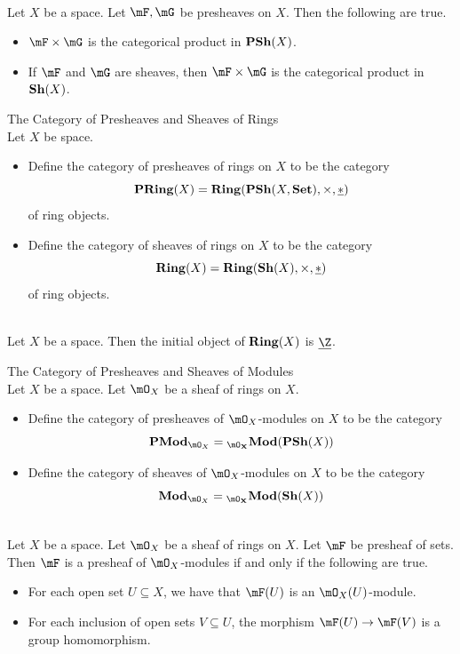 \documentclass[a4paper]{article}
\begin{document}
\begin{prp}{}{}\\
Let $X$ be a space. Let $\mF,\mG$ be presheaves on $X$. Then the following are true. 
\begin{itemize}
\item $\mF\times\mG$ is the categorical product in $\bold{PSh}(X)$. 
\item If $\mF$ and $\mG$ are sheaves, then $\mF\times\mG$ is the categorical product in $\bold{Sh}(X)$. 
\end{itemize}
\end{prp}

\begin{defn}{The Category of Presheaves and Sheaves of Rings}{}\\
Let $X$ be space. 
\begin{itemize}
\item Define the category of presheaves of rings on $X$ to be the category $$\bold{PRing}(X)=\bold{Ring}(\bold{PSh}(X,\bold{Set}),\times,\underline{\ast})$$ of ring objects. 
\item Define the category of sheaves of rings on $X$ to be the category $$\bold{Ring}(X)=\bold{Ring}(\bold{Sh}(X),\times,\underline{\ast})$$ of ring objects. 
\end{itemize}
\end{defn}

\begin{prp}{}{}\\
Let $X$ be a space. Then the initial object of $\bold{Ring}(X)$ is $\underline{\Z}$. 
\end{prp}

\begin{defn}{The Category of Presheaves and Sheaves of Modules}{}\\
Let $X$ be a space. Let $\mO_X$ be a sheaf of rings on $X$. 
\begin{itemize}
\item Define the category of presheaves of $\mO_X$-modules on $X$ to be the category $$\bold{PMod}_{\mO_X}={_\bold{\mO_X}\bold{Mod}(\bold{PSh}(X))}$$
\item Define the category of sheaves of $\mO_X$-modules on $X$ to be the category $$\bold{Mod}_{\mO_X}={_\bold{\mO_X}\bold{Mod}(\bold{Sh}(X))}$$
\end{itemize}
\end{defn}

\begin{prp}{}{}\\
Let $X$ be a space. Let $\mO_X$ be a sheaf of rings on $X$. Let $\mF$ be presheaf of sets. Then $\mF$ is a presheaf of $\mO_X$-modules if and only if the following are true. 
\begin{itemize}
\item For each open set $U\subseteq X$, we have that $\mF(U)$ is an $\mO_X(U)$-module. 
\item For each inclusion of open sets $V\subseteq U$, the morphism $\mF(U)\to\mF(V)$ is a group homomorphism. 
\end{itemize}
\end{prp}
\end{document}
